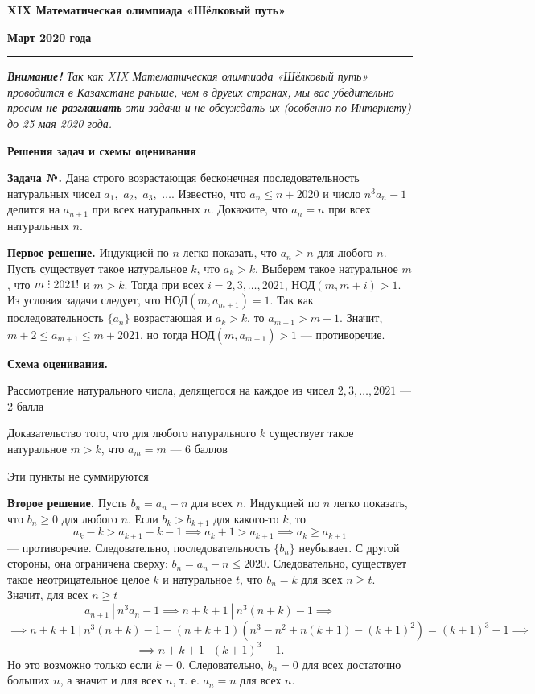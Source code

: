 \documentclass[12pt]{article}
\newcounter{zadacha}
\newcommand{\z}{\par  \smallskip \noindent \refstepcounter{zadacha}%
\textbf{Задача №\arabic{zadacha}.} }
\def\solI{\noindent \textbf{Первое решение. }}
\def\solII{\par \noindent \textbf{Второе решение. }}
\DeclareRobustCommand{\divby}{%
  \mathrel{\text{\vbox{\baselineskip.65ex\lineskiplimit0pt\hbox{.}\hbox{.}\hbox{.}}}}%
}
\begin{document}
\centerline{\sc \textbf{XIX Математическая олимпиада «Шёлковый путь»}}

\centerline{\sc \textbf{Март 2020 года}}

\bigskip
\hrule
\bigskip

\textsl{\textbf{Внимание!} 
Так как XIX Математическая олимпиада «Шёлковый путь» проводится в Казахстане раньше, чем в других странах, мы вас убедительно просим \textbf{не разглашать} эти задачи и не обсуждать их (особенно по Интернету) до 25 мая 2020 года.}

\bigskip

\centerline{\sc \textbf{Решения задач и схемы оценивания}}

\bigskip

\z Дана строго возрастающая бесконечная последовательность натуральных чисел $a_1,$ $a_2,$ $a_3,$ $\ldots$. Известно, что $a_n \leq n + 2020$ и число $n^3 a_n - 1$ делится на $a_{n+1}$ при всех натуральных $n$. Докажите, что $a_n = n$ при всех натуральных $n$. %

\bigskip

\solI Индукцией по $n$ легко показать, что $a_n \geq n$ для любого $n$. Пусть существует такое натуральное $k$, что $a_k > k$. Выберем такое натуральное $m$, что $m \divby 2021!$ и $m > k$. Тогда при всех $i=2, 3, \ldots, 2021$, НОД$(m, m+i) > 1$. Из условия задачи следует, что НОД$(m, a_{m+1})=1$. Так как последовательность $\{a_n\}$ возрастающая и $a_k > k$, то $a_{m+1} > m+1$. Значит, $m + 2 \leq a_{m+1} \leq m + 2021$, но тогда НОД$(m, a_{m+1}) > 1$ --- противоречие.

\bigskip

\textbf{Схема оценивания.}
\begin{compactitem}
\item Рассмотрение натурального числа, делящегося на каждое из чисел $2, 3, \ldots, 2021$ --- 2 балла
\item Доказательство того, что для любого натурального $k$ существует такое натуральное $m > k$, что $a_m = m$ --- 6 баллов
\item Эти пункты не суммируются
\end{compactitem}

\bigskip

\solII Пусть $b_n = a_n - n$ для всех $n$. Индукцией по $n$ легко показать, что $b_n \geq 0$ для любого $n$. Если $b_k > b_{k+1}$ для какого-то $k$, то 
\[a_k - k > a_{k+1} - k - 1 \implies a_k + 1 > a_{k+1} \implies a_k \geq a_{k+1}\]
--- противоречие. Следовательно, последовательность $\{b_n\}$ неубывает. С другой стороны, она ограничена сверху: $b_n = a_n - n \leq 2020$. Следовательно, существует такое неотрицательное целое $k$ и натуральное $t$, что $b_n = k$ для всех $n \geq t$. Значит, для всех $n \geq t$
\[a_{n+1} \ | \ n^3 a_n - 1 \implies n + k + 1 \ | \ n^3 (n + k) - 1 \implies\]
\[\implies n + k + 1 \ | \ n^3 (n + k) - 1 - (n + k + 1)(n^3 - n^2 + n(k+1) - (k+1)^2) = (k + 1)^3 - 1 \implies\]
\[\implies n + k + 1 \ | \ (k + 1)^3 - 1.\]
Но это возможно только если $k = 0$. Следовательно, $b_n = 0$ для всех достаточно больших $n$, а значит и для всех $n$, т. е. $a_n = n$ для всех $n$.
\end{document}
